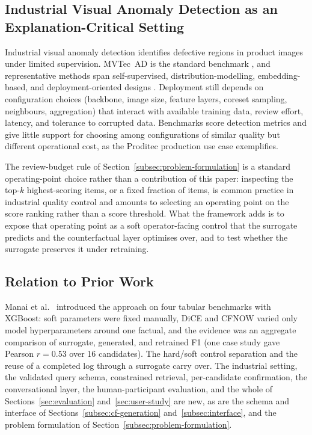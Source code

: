 \documentclass[final,5p,times,twocolumn]{elsarticle}
\begin{document}
\subsection{Industrial Visual Anomaly Detection as an Explanation-Critical Setting}
\label{subsec:rw-ad}

Industrial visual anomaly detection identifies defective regions in
product images under limited supervision. MVTec~AD is the standard
benchmark \cite{bergmann_mvtec_2019}, and representative methods span
self-supervised, distribution-modelling, embedding-based, and
deployment-oriented designs
\cite{li_cutpaste_2021,defard_padim_2021,roth_towards_2022,batzner_efficientad_2024}.
Deployment still depends on configuration choices (backbone, image
size, feature layers, coreset sampling, neighbours, aggregation) that
interact with available training data, review effort, latency, and
tolerance to corrupted data. Benchmarks score detection metrics
\cite{bergmann_mvtec_2019,roth_towards_2022} and give little support
for choosing among configurations of similar quality but different
operational cost, as the Proditec production use case exemplifies.

The review-budget rule of Section~\ref{subsec:problem-formulation} is a
standard operating-point choice rather than a contribution of this
paper: inspecting the top-$k$ highest-scoring items, or a fixed
fraction of items, is common practice in industrial quality control and
amounts to selecting an operating point on the score ranking rather than
a score threshold. What the framework adds is to expose that operating
point as a soft operator-facing control that the surrogate predicts and
the counterfactual layer optimises over, and to test whether the
surrogate preserves it under retraining.



\subsection{Relation to Prior Work}
\label{subsec:rw-conference}

Manai et al.\ \cite{manai_cfhpo_conference} introduced the approach on four tabular benchmarks with XGBoost: soft parameters were
fixed manually, DiCE and CFNOW varied only model hyperparameters around
one factual, and the evidence was an aggregate comparison of surrogate,
generated, and retrained F1 (one case study gave Pearson $r = 0.53$ over
16 candidates). The hard/soft control separation and the reuse of a
completed log through a surrogate carry over. The industrial setting,
the validated query schema, constrained retrieval, per-candidate
confirmation, the conversational layer, the human-participant evaluation, and the whole of Sections~\ref{sec:evaluation} and~\ref{sec:user-study} are new, as are the schema and interface of Sections~\ref{subsec:cf-generation}
and~\ref{subsec:interface}, and the problem formulation of
Section~\ref{subsec:problem-formulation}.
\end{document}
